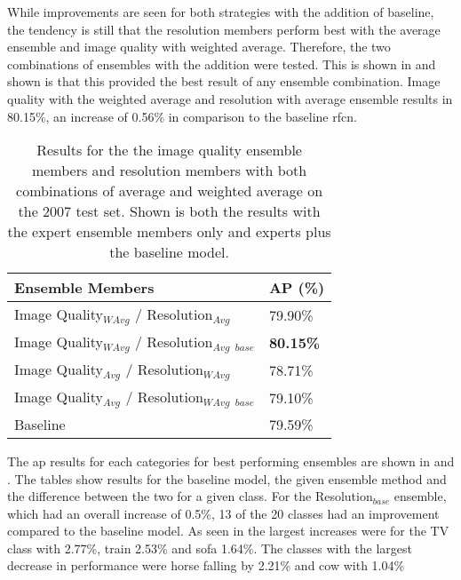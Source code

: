 \documentclass[a4paper,twoside]{article}
\begin{document}
While improvements are seen for both strategies with the addition of baseline, the tendency is still that the resolution members perform best with the average ensemble and image quality with weighted average. Therefore, the two combinations of ensembles with the addition were tested. This is shown in  and shown is that this provided the best result of any ensemble combination. Image quality with the weighted average and resolution with average ensemble results in 80.15\%, an increase of 0.56\% in comparison to the baseline \gls{rfcn}.

\begin{table}[h]
\centering
\caption{Results for the the image quality ensemble members and resolution members with both combinations of average and weighted average on the 2007 test set.  Shown is both the results with the expert ensemble members only and experts plus the baseline model.}
\label{tab:ensemble_comb_base}
\begin{tabular}{|l|l|}
\hline
\textbf{Ensemble Members}                  & \textbf{AP (\%)} \\ \hline
Image Quality$_{WAvg}$ / Resolution$_{Avg}$  & 79.90\% \\ \hline
Image Quality$_{WAvg}$ / Resolution$_{Avg}$ $_{base}$ & \textbf{80.15\%} \\ \hline
Image Quality$_{Avg}$ / Resolution$_{WAvg}$ & 78.71\% \\ \hline
Image Quality$_{Avg}$ / Resolution$_{WAvg}$ $_{base}$ & 79.10\% \\ \hline
Baseline                          & 79.59\% \\ \hline
\end{tabular}
\end{table}


The \gls{ap} results for each categories for best performing ensembles are shown in  and . The tables show results for the baseline model, the given ensemble method and the difference between the two for a given class. For the Resolution$_{base}$ ensemble, which had an overall increase of 0.5\%, 13 of the 20 classes had an improvement compared to the baseline model. As seen in  the largest increases were for the TV class with 2.77\%, train 2.53\% and sofa 1.64\%. The classes with the largest decrease in performance were horse falling by 2.21\% and cow with 1.04\%
\end{document}
